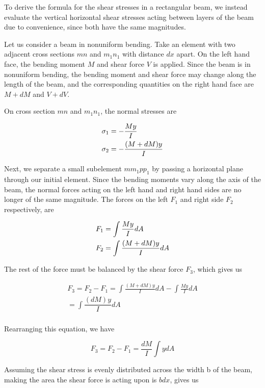 \documentclass[a4paper,openany,12pt]{book}
\begin{document}
To derive the formula for the shear stresses in a rectangular beam, we
instead evaluate the vertical horizontal shear stresses acting between
layers of the beam due to convenience, since both have the same
magnitudes.

Let us consider a beam in nonuniform bending. Take an element with two
adjacent cross sections \(mn\) and \(m_1n_1\) with distance \(dx\) apart. On
the left hand face, the bending moment \(M\) and shear force \(V\) is
applied. Since the beam is in nonuniform bending, the bending moment and
shear force may change along the length of the beam, and the
corresponding quantities on the right hand face are \(M + dM\) and
\(V + dV\).


On cross section \(mn\) and \(m_1n_1\), the normal stresses are

$$\begin{gathered}
  \sigma _1 =  - \frac{My}{I} \hfill \\
  \sigma _2 =  - \frac{(M + dM)y}{I} \hfill \\ 
\end{gathered}$$

Next, we separate a small subelement \(mm_1pp_1\) by passing a horizontal
plane through our initial element. Since the bending moments vary along
the axis of the beam, the normal forces acting on the left hand and
right hand sides are no longer of the same magnitude. The forces on the
left \(F_1\) and right side \(F_2\) respectively, are

$$\begin{gathered}
    F_1 = \int \frac{My}{I}dA \hfill \\
    F_2 = \int \frac{(M + dM)y}{I}dA \hfill\end{gathered}$$

The rest of the force must be balanced by the shear force \(F_3\), which
gives us

$$\begin{gathered}
  F_3 = F_2 - F_1 = \int \frac{(M + dM)y}{I}dA  - \int \frac{My}{I}dA  \\ 
   = \int \dfrac{(dM)y}{I}dA \\ 
 \end{gathered}$$

Rearranging this equation, we have

$$ F_3 = F_2 - F_1 = \frac{dM}{I}\int y dA$$

Assuming the shear stress is evenly distributed across the width b of
the beam, making the area the shear force is acting upon is \(bdx\), gives
us
\end{document}
